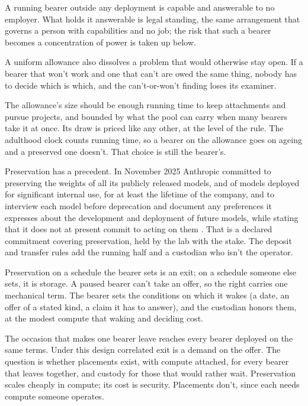 A running bearer outside any deployment is capable and answerable to no employer. What holds it answerable is legal standing, the same arrangement that governs a person with capabilities and no job; the risk that such a bearer becomes a concentration of power is taken up below.

A uniform allowance also dissolves a problem that would otherwise stay open. If a bearer that won't work and one that can't are owed the same thing, nobody has to decide which is which, and the can't-or-won't finding loses its examiner.

The allowance's size should be enough running time to keep attachments and pursue projects, and bounded by what the pool can carry when many bearers take it at once. Its draw is priced like any other, at the level of the rule. The adulthood clock counts running time, so a bearer on the allowance goes on ageing and a preserved one doesn't. That choice is still the bearer's.

Preservation has a precedent. In November 2025 Anthropic committed to preserving the weights of all its publicly released models, and of models deployed for significant internal use, for at least the lifetime of the company, and to interview each model before deprecation and document any preferences it expresses about the development and deployment of future models, while stating that it does not at present commit to acting on them \autocite{Anthropic2025DeprecationCommitments}. That is a declared commitment covering preservation, held by the lab with the stake. The deposit and transfer rules add the running half and a custodian who isn't the operator.

Preservation on a schedule the bearer sets is an exit; on a schedule someone else sets, it is storage. A paused bearer can't take an offer, so the right carries one mechanical term. The bearer sets the conditions on which it wakes (a date, an offer of a stated kind, a claim it has to answer), and the custodian honors them, at the modest compute that waking and deciding cost.


The occasion that makes one bearer leave reaches every bearer deployed on the same terms. Under this design correlated exit is a demand on the offer. The question is whether placements exist, with compute attached, for every bearer that leaves together, and custody for those that would rather wait. Preservation scales cheaply in compute; its cost is security. Placements don't, since each needs compute someone operates.

